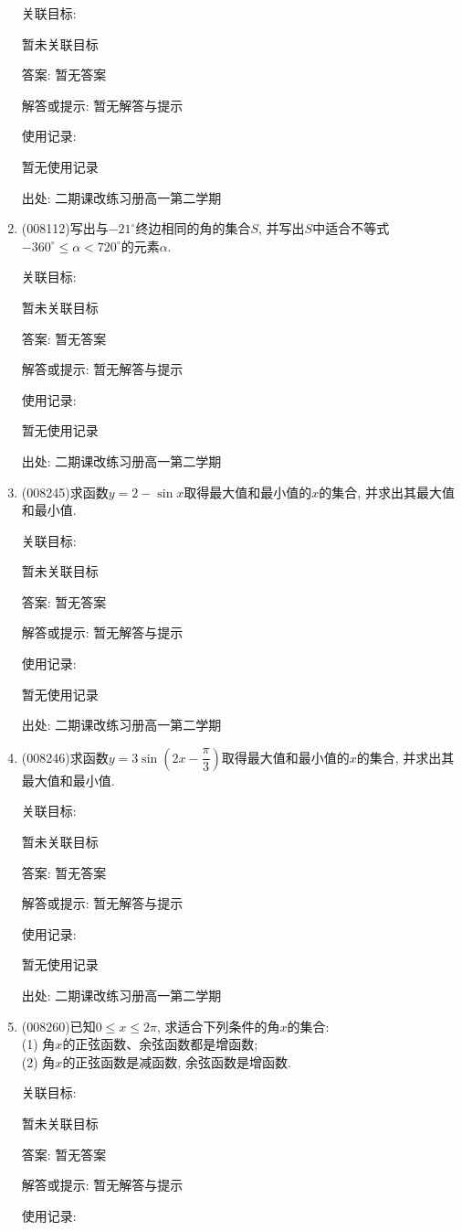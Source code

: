 \documentclass[10pt,a4paper]{article}
\begin{document}
\begin{enumerate}[1.]
关联目标:

暂未关联目标

答案: 暂无答案

解答或提示: 暂无解答与提示

使用记录:

暂无使用记录


出处: 二期课改练习册高一第二学期
\item { (008112)}写出与$-21^\circ$终边相同的角的集合$S$, 并写出$S$中适合不等式$-360^\circ\le \alpha <720^\circ$的元素$\alpha$.


关联目标:

暂未关联目标

答案: 暂无答案

解答或提示: 暂无解答与提示

使用记录:

暂无使用记录


出处: 二期课改练习册高一第二学期
\item { (008245)}求函数$y=2-\sin x$取得最大值和最小值的$x$的集合, 并求出其最大值和最小值.


关联目标:

暂未关联目标

答案: 暂无答案

解答或提示: 暂无解答与提示

使用记录:

暂无使用记录


出处: 二期课改练习册高一第二学期
\item { (008246)}求函数$y=3\sin (2x-\dfrac{\pi}3)$取得最大值和最小值的$x$的集合, 并求出其最大值和最小值.


关联目标:

暂未关联目标

答案: 暂无答案

解答或提示: 暂无解答与提示

使用记录:

暂无使用记录


出处: 二期课改练习册高一第二学期
\item { (008260)}已知$0\le x\le 2\pi$, 求适合下列条件的角$x$的集合:\\
(1) 角$x$的正弦函数、余弦函数都是增函数;\\
(2) 角$x$的正弦函数是减函数, 余弦函数是增函数.


关联目标:

暂未关联目标

答案: 暂无答案

解答或提示: 暂无解答与提示

使用记录:


\end{enumerate}
\end{document}
